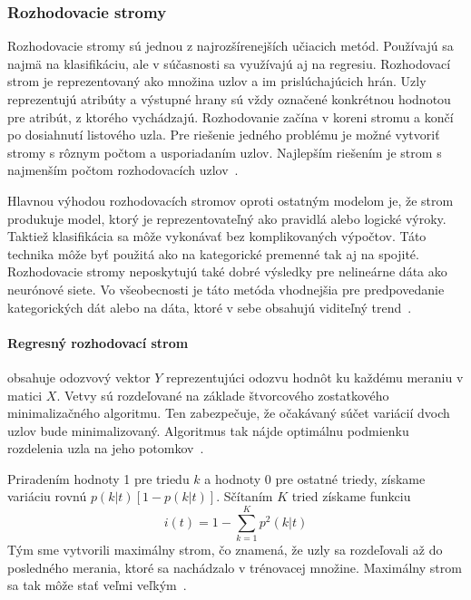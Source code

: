 \documentclass[a4paper,slovak,12pt,appendix]{article}
\begin{document}
\subsubsection{Rozhodovacie stromy}
Rozhodovacie stromy sú jednou z najrozšírenejších učiacich metód. Používajú sa
najmä na klasifikáciu, ale v súčasnosti sa využívajú aj na regresiu.
Rozhodovací strom je reprezentovaný ako množina uzlov a im prislúchajúcich
hrán. Uzly reprezentujú atribúty a výstupné hrany sú vždy označené konkrétnou
hodnotou pre atribút, z ktorého vychádzajú. Rozhodovanie začína v koreni stromu
a končí po dosiahnutí listového uzla. Pre riešenie jedného problému je možné
vytvoriť stromy s rôznym počtom a usporiadaním uzlov. Najlepším riešením je
strom s najmenším počtom rozhodovacích uzlov~\cite{Merz1998}.

Hlavnou výhodou rozhodovacích stromov oproti ostatným modelom je, že strom
produkuje model, ktorý je reprezentovateľný ako pravidlá alebo logické výroky.
Taktiež klasifikácia sa môže vykonávať bez komplikovaných výpočtov. Táto
technika môže byť použitá ako na kategorické premenné tak aj na spojité.
Rozhodovacie stromy neposkytujú také dobré výsledky pre nelineárne dáta ako
neurónové siete. Vo všeobecnosti je táto metóda vhodnejšia pre predpovedanie
kategorických dát alebo na dáta, ktoré v sebe obsahujú viditeľný
trend~\cite{Tso2007}.


\paragraph{Regresný rozhodovací strom} obsahuje odozvový vektor $Y$
reprezentujúci odozvu hodnôt ku každému meraniu v matici $X$. Vetvy sú
rozdeľované na základe štvorcového zostatkového minimalizačného algoritmu.
Ten zabezpečuje, že očakávaný súčet variácií dvoch uzlov bude minimalizovaný.
Algoritmus tak nájde optimálnu podmienku rozdelenia uzla na jeho
potomkov~\cite{Bel2009}.

Priradením hodnoty 1 pre triedu $k$ a hodnoty 0 pre ostatné triedy, získame
variáciu rovnú $p(k|t)[1 - p(k|t)]$. Sčítaním $K$ tried získame funkciu
\begin{equation}
  i(t) = 1 - \sum_{k = 1}^K p^2 (k|t)
  \label{eq-tree-impurity}
\end{equation}
Tým sme vytvorili maximálny strom, čo znamená, že uzly sa rozdeľovali až do
posledného merania, ktoré sa nachádzalo v trénovacej množine. Maximálny strom
sa tak môže stať veľmi veľkým~\cite{Bel2009}.
\end{document}
